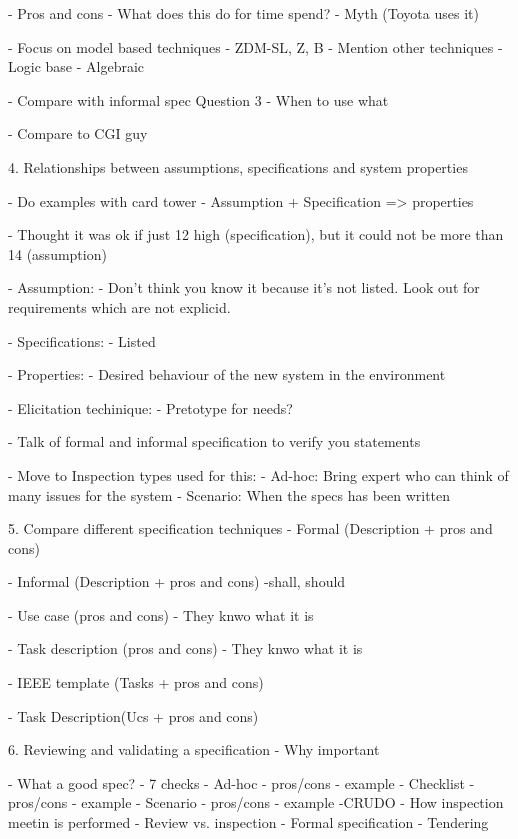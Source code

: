 - Pros and cons
	- What does this do for time spend?
	- Myth (Toyota uses it)

- Focus on model based techniques
	- ZDM-SL, Z, B
	- Mention other techniques
		- Logic base
		- Algebraic 

- Compare with informal spec Question 3
	- When to use what

- Compare to CGI guy



4. Relationships between assumptions, specifications and system properties

- Do examples with card tower
- Assumption + Specification => properties

- Thought it was ok if just 12 high (specification), but it could not be more than 14 (assumption)



- Assumption: 
	- Don't think you know it because it's not listed. Look out for requirements which are not explicid. 

- Specifications:
	- Listed 

- Properties:
	- Desired behaviour of the new system in the environment
	
- Elicitation techinique:
	- Pretotype for needs?

- Talk of formal and informal specification to verify you statements

- Move to Inspection types used for this:
	- Ad-hoc: Bring expert who can think of many issues for the system
	- Scenario: When the specs has been written




5. Compare different specification techniques
- Formal (Description + pros and cons)

- Informal (Description + pros and cons)
	-shall, should

- Use case (pros and cons)
	- They knwo what it is

- Task description (pros and cons)
	- They knwo what it is

- IEEE template (Tasks + pros and cons)

- Task Description(Ucs + pros and cons)





6. Reviewing and validating a specification
- Why important

- What a good spec?
	- 7 checks
- Ad-hoc
	- pros/cons
	- example
- Checklist
	- pros/cons
	- example
- Scenario
	- pros/cons
	- example
-CRUDO
- How inspection meetin is performed
- Review vs. inspection
- Formal specification
- Tendering
	




